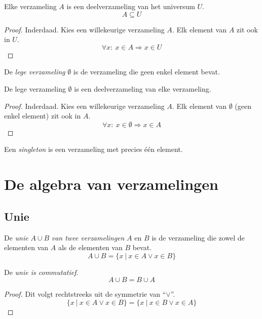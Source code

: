 \documentclass[main.tex]{subfiles}
\begin{document}
\begin{st}
  Elke verzameling $A$ is een deelverzameling van het universum $U$.
  \[ A \subseteq U \]
  \begin{proof}
    Inderdaad. Kies een willekeurige verzameling $A$. 
    Elk element van $A$ zit ook in $U$.
    \[
    \forall x:\ x \in A \Rightarrow x \in U
    \]
  \end{proof}
\end{st}

\begin{de}
  De \emph{lege verzameling} $\emptyset$ is de verzameling die geen enkel element bevat.
\end{de}

\begin{st}
  De lege verzameling $\emptyset$ is een deelverzameling van elke verzameling.
  \begin{proof}
    Inderdaad. Kies een willekeurige verzameling $A$.
    Elk element van $\emptyset$ (geen enkel element) zit ook in $A$.
    \[
    \forall x:\ x \in \emptyset \Rightarrow x \in A
    \]
  \end{proof}
\end{st}

\begin{de}
  Een \emph{singleton} is een verzameling met precies \'e\'en element.
\end{de}

\section{De algebra van verzamelingen}
\label{sec:de-algebra-van-verzamelingen}

\subsection{Unie}
\label{sec:unie}

\begin{de}
  De \emph{unie} $A \cup B$ \emph{van twee verzamelingen} $A$ en $B$ is de verzameling die zowel de elementen van $A$ als de elementen van $B$ bevat.
  \[ A \cup B = \{ x\ |\ x \in A \vee x \in B\} \]
\end{de}

\begin{ei}
  De \emph{unie is commutatief}.
  \[ A \cup B = B \cup A \]
  \begin{proof}
    Dit volgt rechtstreeks uit de symmetrie van ``$\vee$''.
    \[ \{ x\ |\ x \in A \vee x \in B\} = \{ x\ |\ x \in B \vee x \in A\} \]
  \end{proof}
\end{ei}
\end{document}
